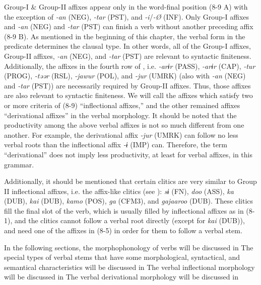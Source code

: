 Group-I \& Group-II affixes appear only in the word-final position (8-9 A) with the exception of \textit{{}-an} (NEG), \textit{{}-tar} (PST), and \textit{{}-i}/\textit{{}-Ø} (INF). Only Group-I affixes and \textit{{}-an} (NEG) and \textit{-tar} (PST) can finish a verb without another preceding affix (8-9 B). As mentioned in the beginning of this chapter, the verbal form in the predicate determines the clausal type. In other words, all of the Group-I affixes, Group-II affixes, \textit{{}-an} (NEG), and \textit{-tar} (PST) are relevant to syntactic finiteness. Additionally, the affixes in the fourth row of , i.e. \textit{{}-arɨr} (PASS), \textit{-arɨr} (CAP), \textit{-tur} (PROG), \textit{{}-təər} (RSL), \textit{{}-jawur} (POL), and \textit{{}-jur} (UMRK) (also with \textit{{}-an} (NEG) and \textit{{}-tar} (PST)) are necessarily required by Group-II affixes. Thus, those affixes are also relevant to syntactic finiteness. We will call the affixes which satisfy two or more criteria of (8-9) “inflectional affixes,” and the other remained affixes “derivational affixes” in the verbal morphology. It should be noted that the productivity among the above verbal affixes is not so much different from one another. For example, the derivational affix \textit{{}-jur} (UMRK) can follow no less verbal roots than the inflectional affix \textit{{}-ɨ} (IMP) can. Therefore, the term “derivational” does not imply less productivity, at least for verbal affixes, in this grammar.

  Additionally, it should be mentioned that certain clitics are very similar to Group II inflectional affixes, i.e. the affix-like clitics (see ): \textit{sɨ} (FN), \textit{doo} (ASS), \textit{ka} (DUB), \textit{kai} (DUB), \textit{kamo} (POS), \textit{ga} (CFM3), and \textit{gajaaroo} (DUB). These clitics fill the final slot of the verb, which is usually filled by inflectional affixes as in (8-1), and the clitics cannot follow a verbal root directly (except for \textit{kai} (DUB)), and need one of the affixes in (8-5) in order for them to follow a verbal stem.

  In the following sections, the morphophonology of verbs will be discussed in  The special types of verbal stems that have some morphological, syntactical, and semantical characteristics will be discussed in  The verbal inflectional morphology will be discussed in  The verbal derivational morphology will be discussed in 

